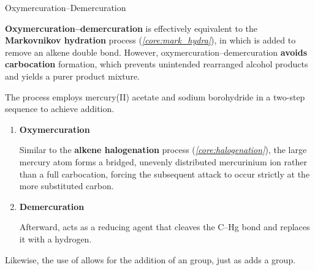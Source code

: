 \documentclass[10pt]{article}
\begin{document}
      \begin{core}[label=core:alkene_oxymercuration]{Oxymercuration--Demercuration}

        \textbf{Oxymercuration--demercuration} is effectively equivalent to the \textbf{Markovnikov hydration} process (\textit{\autoref{core:mark_hydra}}), in which  is added to remove an alkene double bond. However, oxymercuration--demercuration \textbf{avoids carbocation} formation, which prevents unintended rearranged alcohol products and yields a purer product mixture.

        The process employs mercury(II) acetate and sodium borohydride in a two-step sequence to achieve  addition.


        \begin{enumerate}[label=(\arabic*)]

          \item \textbf{Oxymercuration} 

          Similar to the \textbf{alkene halogenation} process (\textit{\autoref{core:halogenation}}), the large mercury atom forms a bridged, unevenly distributed mercurinium ion rather than a full carbocation, forcing the subsequent  attack to occur strictly at the more substituted carbon.

          \item \textbf{Demercuration}

          Afterward,  acts as a reducing agent that cleaves the C--Hg bond and replaces it with a hydrogen.

        \end{enumerate}

        Likewise, the use of  allows for the addition of an  group, just as  adds a  group.



\end{core}
\end{document}
